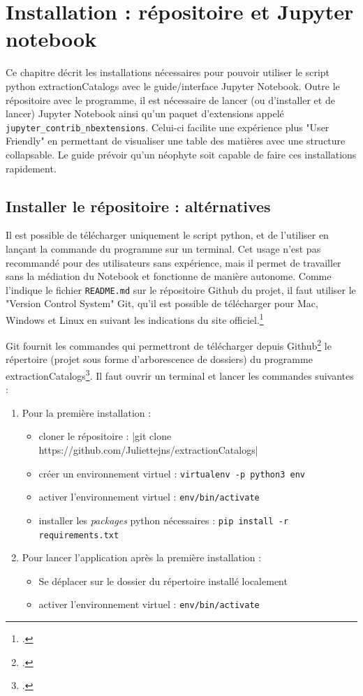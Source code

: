 \documentclass[a4paper,12pt,twoside]{book}
\begin{document}
	\chapter{Installation : répositoire et Jupyter notebook}
	\label{installation}
	
Ce chapitre décrit les installations nécessaires pour pouvoir utiliser le script python extractionCatalogs avec le guide/interface Jupyter Notebook. Outre le répositoire avec le programme, il est nécessaire de lancer (ou d'installer et de lancer) Jupyter Notebook ainsi qu'un paquet d'extensions appelé \texttt{jupyter\_contrib\_nbextensions}. Celui-ci facilite une expérience plus "User Friendly" en permettant de visualiser une table des matières avec une structure collapsable. Le guide prévoir qu'un néophyte soit capable de faire ces installations rapidement. 

\section{Installer le répositoire : altérnatives}

Il est possible de télécharger uniquement le script python, et de l'utiliser en lançant la commande du programme sur un terminal. Cet usage n'est pas recommandé pour des utilisateurs sans expérience, mais il permet de travailler sans la médiation du Notebook et fonctionne de manière autonome. Comme l'indique le fichier \texttt{README.md} sur le répositoire Github du projet, il faut utiliser le "Version Control System" Git, qu'il est possible de télécharger pour Mac, Windows et Linux en suivant les indications du site officiel.\footcite{Git}


Git fournit les commandes qui permettront de télécharger depuis Github\footcite{Github} le répertoire (projet sous forme d'arborescence de dossiers) du programme extractionCatalogs\footcite{ExtractionCatalogs}. Il faut ouvrir un terminal et lancer les commandes suivantes :
	
\begin{enumerate}
	\item Pour la première installation :
	\begin{itemize}
		\item cloner le répositoire : 
		|git clone https://github.com/Juliettejns/extractionCatalogs|
		\item créer un environnement virtuel : \texttt{virtualenv -p python3 env}
		\item activer l'environnement virtuel : \texttt{env/bin/activate}
		\item installer les \textit{packages} python nécessaires : \texttt{pip install -r requirements.txt}
	\end{itemize}
	\item Pour lancer l'application après la première installation :
	\begin{itemize}
		\item Se déplacer sur le dossier du répertoire installé localement
		\item activer l'environnement virtuel : \texttt{env/bin/activate}
	\end{itemize}
\end{enumerate}
\end{document}
